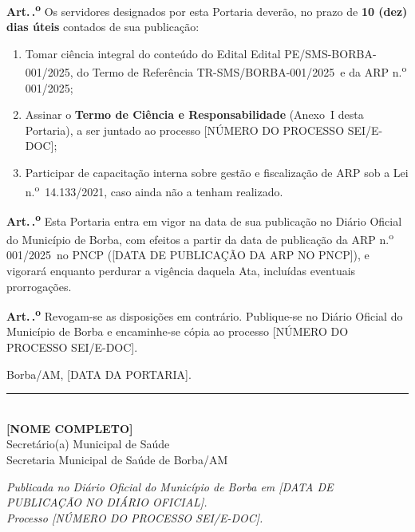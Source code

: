\documentclass[12pt,a4paper]{article}
\newcounter{artigo}
\newcommand{\artigo}[1]{%
  \stepcounter{artigo}%
  \medskip\noindent\textbf{Art.\,\theartigo.\textsuperscript{o}} #1}
\newcommand{\arpRef}{ARP n.\textsuperscript{o} 001/2025}
\newcommand{\editalRef}{Edital PE/SMS-BORBA-001/2025}
\newcommand{\trRef}{TR-SMS/BORBA-001/2025}
\newcommand{\procNum}{[NÚMERO DO PROCESSO SEI/E-DOC]}
\newcommand{\pubData}{[DATA DE PUBLICAÇÃO DA ARP NO PNCP]}
\newcommand{\portData}{[DATA DA PORTARIA]}
\newcommand{\doeData}{[DATA DE PUBLICAÇÃO NO DIÁRIO OFICIAL]}
\newcommand{\secretarioNome}{[NOME COMPLETO]}
\newcommand{\secretarioCargo}{Secretário(a) Municipal de Saúde}
\begin{document}
\vspace{0.5cm}

\artigo{Os servidores designados por esta Portaria deverão, no prazo de
\textbf{10 (dez) dias úteis} contados de sua publicação:}

\begin{enumerate}[label=\Roman*.]
  \item Tomar ciência integral do conteúdo do Edital \editalRef, do Termo de
    Referência \trRef\ e da \arpRef;
  \item Assinar o \textbf{Termo de Ciência e Responsabilidade} (Anexo~I desta
    Portaria), a ser juntado ao processo \procNum;
  \item Participar de capacitação interna sobre gestão e fiscalização de ARP
    sob a Lei n.\textsuperscript{o}~14.133/2021, caso ainda não a tenham
    realizado.
\end{enumerate}

\vspace{0.5cm}

\artigo{Esta Portaria entra em vigor na data de sua publicação no Diário Oficial
do Município de Borba, com efeitos a partir da data de publicação da \arpRef\ no
PNCP (\pubData), e vigorará enquanto perdurar a vigência daquela Ata, incluídas
eventuais prorrogações.}

\vspace{0.5cm}

\artigo{Revogam-se as disposições em contrário. Publique-se no Diário Oficial
do Município de Borba e encaminhe-se cópia ao processo \procNum.}

\vspace{1.0cm}

\begin{center}
  Borba/AM, \portData.\\[1.2cm]
  \rule{9cm}{0.5pt}\\[3pt]
  \textbf{\secretarioNome}\\
  \small \secretarioCargo\\
  \small Secretaria Municipal de Saúde de Borba/AM
\end{center}

\vspace{0.4cm}
\begin{center}
  \small\itshape
  Publicada no Diário Oficial do Município de Borba em \doeData.\\
  Processo \procNum.
\end{center}
\end{document}
